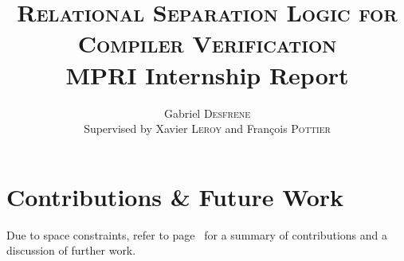 \documentclass[11pt,a4paper]{article}
\title{%
  \textsc{\Large Relational Separation Logic for Compiler Verification} \\
  {\large MPRI Internship Report}
}
\author{%
  Gabriel \textsc{Desfrene} \\
  Supervised by Xavier \textsc{Leroy} and François \textsc{Pottier} \\
}
\date{}
\theoremstyle{definition}
\begin{document}


\newpage















\section{Contributions \& Future Work}
Due to space constraints,
refer to page~\pageref{sec:contributions}
for a summary of contributions and a discussion of further work.
\newpage

\printbibliography[heading=bibintoc]

\newpage
\appendix

\tableofcontents
\newpage


\end{document}
